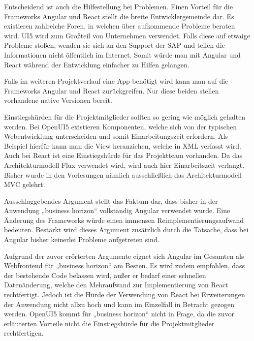Entscheidend ist auch die Hilfestellung bei Problemen. Einen Vorteil für die Frameworks Angular und React stellt die breite Entwicklergemeinde dar. Es existieren zahlreiche Foren, in welchen über aufkommende Probleme beraten wird. UI5 wird zum Großteil von Unternehmen verwendet. Falls diese auf etwaige Probleme stoßen, wenden sie sich an den Support der SAP und teilen die Informationen nicht öffentlich im Internet. Somit würde man mit Angular und React während der Entwicklung einfacher zu Hilfen gelangen.

Falls im weiteren Projektverlauf eine App benötigt wird kann man auf die Frameworks Angular und React zurückgreifen.
Nur diese beiden stellen vorhandene native Versionen bereit.


Einstiegshürden für die Projektmitglieder sollten so gering wie möglich gehalten werden. Bei OpenUI5 existieren Komponenten, welche sich von der typischen Webentwicklung unterscheiden und somit Einarbeitungszeit erfordern. Als Beispiel hierfür kann man die View heranziehen, welche in XML verfasst wird. 
Auch bei React ist eine Einstiegshürde für das Projektteam vorhanden. Da das Architekturmodell Flux verwendet wird, wird auch hier Einarbeitszeit verlangt. Bisher wurde in den Vorlesungen nämlich ausschließlich das Architekturmodell MVC gelehrt.

Ausschlaggebendes Argument stellt das Faktum dar, dass bisher in der Anwendung „business horizon“ vollständig Angular verwendet wurde. Eine Änderung des Frameworks würde einen immensen Reimplementierungsaufwand bedeuten. Bestärkt wird dieses Argument zusätzlich durch die Tatsache, dass bei Angular bisher keinerlei Probleme aufgetreten sind.

Aufgrund der zuvor erörterten Argumente eignet sich Angular im Gesamten als Webfrontend für „business horizon“ am Besten. Es wird zudem empfohlen, dass der bestehende Code belassen wird, außer er bedarf einer schnellen Datenänderung, welche den Mehraufwand zur Implementierung von React rechtfertigt. Jedoch ist die Hürde der Verwendung von React bei Erweiterungen der Anwendung nicht allzu hoch und kann im Einzelfall in Betracht gezogen werden. OpenUI5 kommt für „business horizon“ nicht in Frage, da die zuvor erläuterten Vorteile nicht die Einstiegshürde für die Projektmitglieder rechtfertigen.



